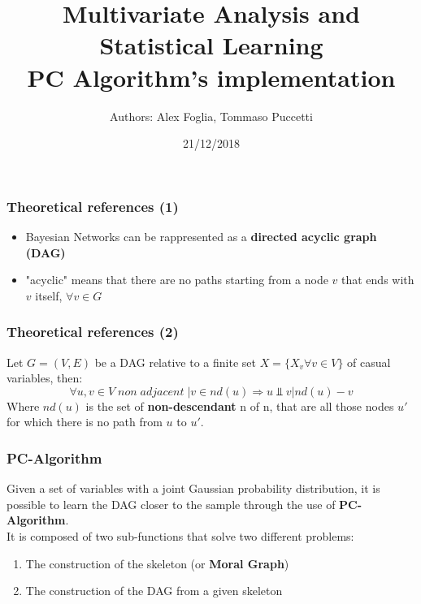 \documentclass[xcolor ={table,usenames,dvipsnames}]{beamer}
\title{Multivariate Analysis and Statistical Learning \\PC Algorithm's implementation}
\author{Authors: Alex Foglia, Tommaso Puccetti}
\institute{Universit\`a  degli Studi di Firenze}
\date{21/12/2018}
\theoremstyle{definition}
\begin{document}
	
	\begin{frame}
		\maketitle
	\end{frame}

	\begin{frame}
		\frametitle{Theoretical references (1)}
		\begin{itemize}
			\item Bayesian Networks can be rappresented as a \textbf{directed acyclic graph (DAG)}
			\item "acyclic" means that there are no paths starting from a node $v$ that ends with $v$ itself, $\forall v \in G$
			
		\end{itemize}
	\end{frame}

	\begin{frame}
		\frametitle{Theoretical references (2)}
		Let $G = (V,E)$ be a DAG relative to a finite set  $X = \{X_v \forall v \in V\}$ of casual variables, then:
		$$
		\forall u,v \in V \;non\;adjacent\;| v \in nd(u) \Rightarrow u \Perp v | nd(u) - v
		$$
	Where $nd(u)$ is the set of \textbf{non-descendant} n of n, that are all those nodes $u'$ for which there is no path from $u$ to $u'$. \\
	\end{frame}

	\begin{frame}
		\frametitle{PC-Algorithm}
		Given a set of variables with a joint Gaussian probability distribution, it is possible to learn the DAG closer to the sample through the use of  \textbf{PC-Algorithm}. \\
		It is composed of two sub-functions that solve two different problems:
		\begin{enumerate}
			\item The construction of the skeleton (or \textbf{Moral Graph})
			\item The construction of the DAG from a given skeleton
		\end{enumerate}
	\end{frame}
\end{document}
